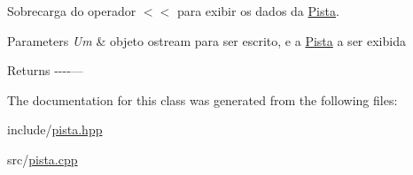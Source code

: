 Sobrecarga do operador $<$$<$ para exibir os dados da \hyperlink{classPista}{Pista}. 


\begin{DoxyParams}{Parameters}
{\em Um} & objeto ostream para ser escrito, e a \hyperlink{classPista}{Pista} a ser exibida \\
\hline
\end{DoxyParams}
\begin{DoxyReturn}{Returns}
-\/-\/-\/-\/--- 
\end{DoxyReturn}


The documentation for this class was generated from the following files\+:\begin{DoxyCompactItemize}
\item 
include/\hyperlink{pista_8hpp}{pista.\+hpp}\item 
src/\hyperlink{pista_8cpp}{pista.\+cpp}\end{DoxyCompactItemize}
